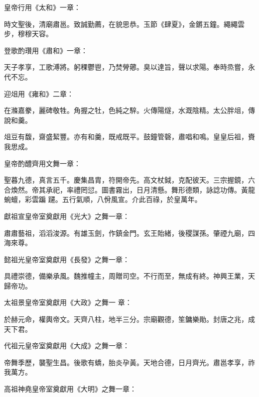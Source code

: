 \begin{pinyinscope}
 皇帝行用《太和》一章：



 時文聖後，清廟肅邕。致誠勤薦，在貌思恭。玉節《肆夏》，金鏘五鐘。繩繩雲步，穆穆天容。



 登歌酌瓚用《肅和》一章：



 天子孝享，工歌溥將。躬稞鬱鬯，乃焚膋薌。臭以達旨，聲以求陽。奉時烝嘗，永代不忘。



 迎俎用《雍和》二章：



 在滌嘉豢，麗碑敬牲。角握之牡，色純之騂。火傳陽燧，水溉陰精。太公胖俎，傳說和羹。



 俎豆有馥，齋盛絜豐。亦有和羹，既戒既平。鼓鐘管磬，肅唱和鳴。皇皇后祖，賚我思成。



 皇帝酌醴齊用文舞一章：



 聖暮九德，真言五千。慶集昌胄，符開帝先。高文杖鉞，克配彼天。三宗握鏡，六合煥然。帝其承祀，率禮罔愆。圖書霧出，日月清懸。舞形德類，詠諗功傳。黃龍蜿蟺，彩雲蹁
 躚。五行氣順，八佾風宣。介此百祿，於皇萬年。



 獻祖宣皇帝室奠獻用《光大》之舞一章：



 肅肅藝祖，滔滔浚源。有雄玉劍，作鎮金門。玄王貽緒，後稷謀孫。肇禋九廟，四海來尊。



 懿祖光皇帝室奠獻用《長發》之舞一章：



 具禮崇德，備樂承風。魏推幢主，周贈司空。不行而至，無成有終。神興王業，天歸帝功。



 太祖景皇帝室奠獻用《大政》之舞一
 章：



 於赫元命，權輿帝文。天齊八柱，地半三分。宗廟觀德，笙鏞樂勛。封唐之兆，成天下君。



 代祖元皇帝室奠獻用《大成》之舞一章：



 帝舞季歷，襲聖生昌。後歌有蟜，胎炎孕黃。天地合德，日月齊光。肅邕孝享，祚我萬方。



 高祖神堯皇帝室奠獻用《大明》之舞一章：




\end{pinyinscope}
